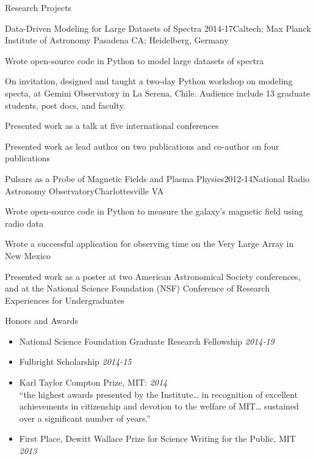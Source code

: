 \documentclass{resume} %
\begin{document}
\begin{rSection}{Research Projects}
  \begin{rSubsection}{Data-Driven Modeling for Large Datasets of Spectra}
    {2014-17}{Caltech; Max Planck Institute of Astronomy}
    {Pasadena CA; Heidelberg, Germany}
  \item
    Wrote open-source code in Python to model large datasets of spectra
  \item
    On invitation, designed and taught a two-day Python workshop on modeling
    specta, at Gemini Observatory in La Serena, Chile.
    Audience include 13 graduate students, post docs, and faculty.
  \item
    Presented work as a talk at five international conferences
  \item
    Presented work as lead author on two publications and 
    co-author on four publications
\end{rSubsection}

\begin{rSubsection}{Pulsars as a Probe of Magnetic Fields and Plasma Physics}{2012-14}{National Radio Astronomy Observatory}{Charlottesville VA}
  \item 
    Wrote open-source code in Python to measure the 
    galaxy's magnetic field using radio data
  \item Wrote a successful application for observing time on the 
    Very Large Array in New Mexico
  \item Presented work as a poster at two
    American Astronomical Society conferences,
    and at the National Science Foundation (NSF) Conference of 
    Research Experiences for Undergraduates
\end{rSubsection}

\end{rSection}


\begin{rSection}{Honors and Awards}

\begin{itemize}
\item
National Science Foundation Graduate Research Fellowship \hfill {\em 2014-19}
\item
Fulbright Scholarship \hfill {\em 2014-15}
\item
  Karl Taylor Compton Prize, MIT: \hfill {\em 2014} \\
``the highest awards presented by the Institute\ldots
in recognition of excellent achievements in citizenship 
and devotion to the welfare of MIT\ldots
sustained over a significant number of years.'' 
\item
First Place, Dewitt Wallace Prize for Science Writing for the Public, 
MIT \hfill {\em 2013} 
\end{itemize}

\end{rSection}
\end{document}

